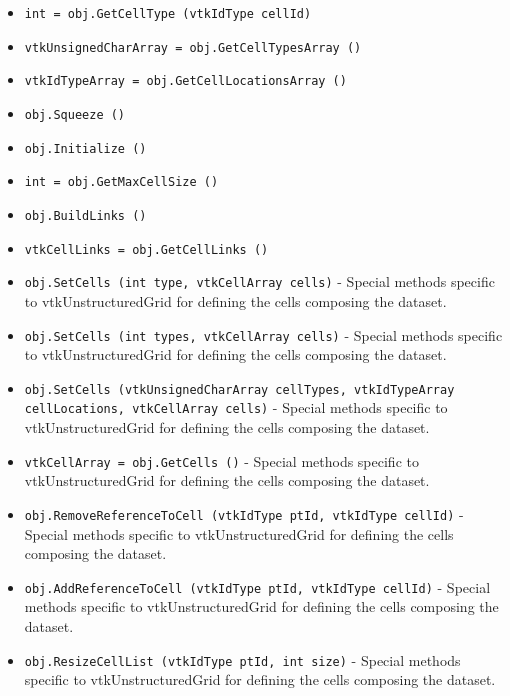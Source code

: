 \begin{itemize}
\item  \verb|int = obj.GetCellType (vtkIdType cellId)|

\item  \verb|vtkUnsignedCharArray = obj.GetCellTypesArray ()|

\item  \verb|vtkIdTypeArray = obj.GetCellLocationsArray ()|

\item  \verb|obj.Squeeze ()|

\item  \verb|obj.Initialize ()|

\item  \verb|int = obj.GetMaxCellSize ()|

\item  \verb|obj.BuildLinks ()|

\item  \verb|vtkCellLinks = obj.GetCellLinks ()|

\item  \verb|obj.SetCells (int type, vtkCellArray cells)| -  Special methods specific to vtkUnstructuredGrid for defining the cells
 composing the dataset.

\item  \verb|obj.SetCells (int types, vtkCellArray cells)| -  Special methods specific to vtkUnstructuredGrid for defining the cells
 composing the dataset.

\item  \verb|obj.SetCells (vtkUnsignedCharArray cellTypes, vtkIdTypeArray cellLocations, vtkCellArray cells)| -  Special methods specific to vtkUnstructuredGrid for defining the cells
 composing the dataset.

\item  \verb|vtkCellArray = obj.GetCells ()| -  Special methods specific to vtkUnstructuredGrid for defining the cells
 composing the dataset.

\item  \verb|obj.RemoveReferenceToCell (vtkIdType ptId, vtkIdType cellId)| -  Special methods specific to vtkUnstructuredGrid for defining the cells
 composing the dataset.

\item  \verb|obj.AddReferenceToCell (vtkIdType ptId, vtkIdType cellId)| -  Special methods specific to vtkUnstructuredGrid for defining the cells
 composing the dataset.

\item  \verb|obj.ResizeCellList (vtkIdType ptId, int size)| -  Special methods specific to vtkUnstructuredGrid for defining the cells
 composing the dataset.


\end{itemize}
